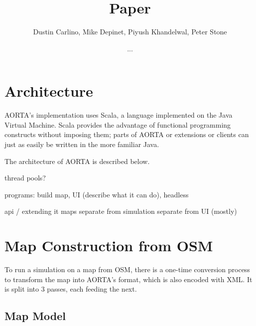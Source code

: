 \documentclass[12pt]{article}
\title{Paper}
\author{Dustin Carlino, Mike Depinet, Piyush Khandelwal, Peter Stone}
\date{...}
\begin{document}
\maketitle




\section{Architecture}

AORTA's implementation uses Scala, a language implemented on the Java Virtual
Machine. Scala provides the advantage of functional programming constructs
without imposing them; parts of AORTA or extensions or clients can just as
easily be written in the more familiar Java.

The architecture of AORTA is described below.

thread pools?

programs: build map, UI (describe what it can do), headless

api / extending it
maps separate from simulation separate from UI (mostly)


\section{Map Construction from OSM}


To run a simulation on a map from OSM, there is a one-time conversion process to
transform the map into AORTA's format, which is also encoded with XML. It is
split into 3 passes, each feeding the next.

\subsection{Map Model}
\end{document}
